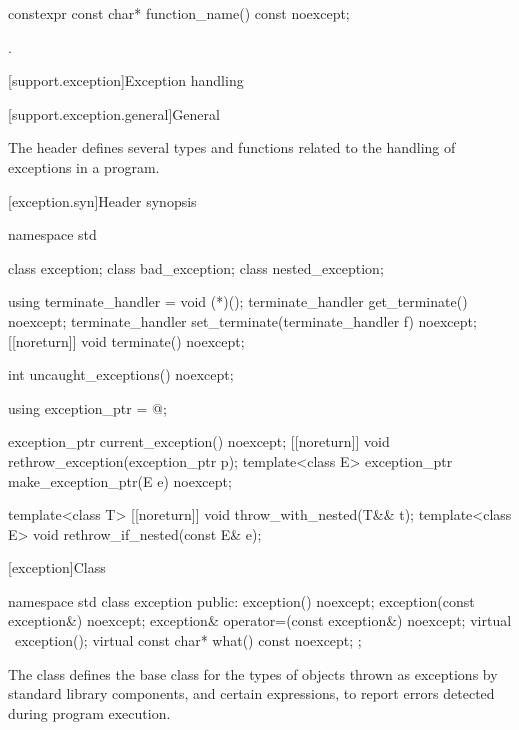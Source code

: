 \begin{itemdecl}
constexpr const char* function_name() const noexcept;
\end{itemdecl}
\begin{itemdescr}
\pnum
\returns
{}.
\end{itemdescr}

[support.exception]{Exception handling}

[support.exception.general]{General}

\pnum
The header 
defines several types and functions related to the handling of exceptions in a \Cpp{} program.

[exception.syn]{Header  synopsis}

\begin{codeblock}
namespace std {
  class exception;
  class bad_exception;
  class nested_exception;

  using terminate_handler = void (*)();
  terminate_handler get_terminate() noexcept;
  terminate_handler set_terminate(terminate_handler f) noexcept;
  [[noreturn]] void terminate() noexcept;

  int uncaught_exceptions() noexcept;

  using exception_ptr = @\unspec@;

  exception_ptr current_exception() noexcept;
  [[noreturn]] void rethrow_exception(exception_ptr p);
  template<class E> exception_ptr make_exception_ptr(E e) noexcept;

  template<class T> [[noreturn]] void throw_with_nested(T&& t);
  template<class E> void rethrow_if_nested(const E& e);
}
\end{codeblock}

[exception]{Class }

%
%
\begin{codeblock}
namespace std {
  class exception {
  public:
    exception() noexcept;
    exception(const exception&) noexcept;
    exception& operator=(const exception&) noexcept;
    virtual ~exception();
    virtual const char* what() const noexcept;
  };
}
\end{codeblock}

\pnum
The class
defines the base
class for the types of objects thrown as exceptions by
\Cpp{} standard library components, and certain
expressions, to report errors detected during program execution.


